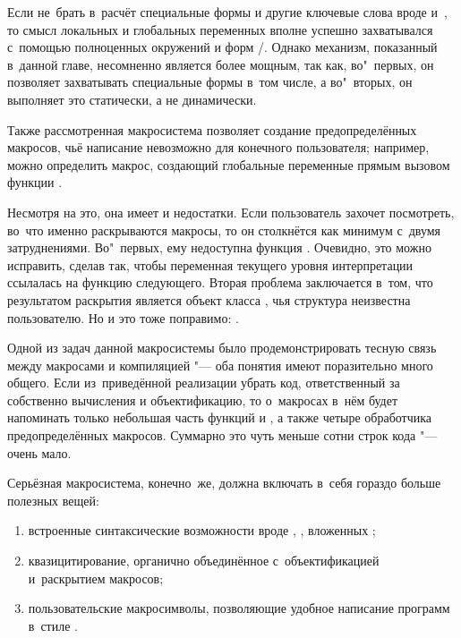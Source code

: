 Если не~брать в~расчёт специальные формы и другие ключевые слова вроде 
и~\ic{=>}, то смысл локальных и глобальных переменных вполне успешно
захватывался с~помощью полноценных окружений и форм \slash{}.
 Однако механизм, показанный в~данной
главе, несомненно является более мощным, так как, во"~первых, он позволяет
захватывать специальные формы в~том числе, а во"~вторых, он выполняет это
статически, а не динамически.

Также рассмотренная макросистема позволяет создание предопределённых макросов,
чьё написание невозможно для конечного пользователя; например, можно определить
макрос, создающий глобальные переменные прямым вызовом функции
.

Несмотря на это, она имеет и недостатки. Если пользователь захочет посмотреть,
во~что именно раскрываются макросы, то он столкнётся как минимум с~двумя
затруднениями. Во"~первых, ему недоступна функция . Очевидно, это
можно исправить, сделав так, чтобы переменная  текущего уровня
интерпретации ссылалась на функцию  следующего. Вторая проблема
заключается в~том, что результатом раскрытия является объект класса
, чья структура неизвестна пользователю. Но и это тоже поправимо:
.

Одной из задач данной макросистемы было продемонстрировать тесную связь между
макросами и компиляцией "--- оба понятия имеют поразительно много общего. Если
из~приведённой реализации убрать код, ответственный за собственно вычисления и
объектификацию, то о~макросах в~нём будет напоминать только небольшая часть
функций  и , а также четыре обработчика
предопределённых макросов. Суммарно это чуть меньше сотни строк кода "--- очень
мало.

Серьёзная макросистема, конечно~же, должна включать в~себя гораздо больше
полезных вещей:

\begin{enumerate}
  \item встроенные синтаксические возможности вроде , ,
        вложенных  {\itd};

  \item квазицитирование, органично объединённое с~объектификацией
        и~раскрытием макросов;

  \item пользовательские макросимволы, позволяющие удобное написание
        программ в~стиле .
\end{enumerate}

